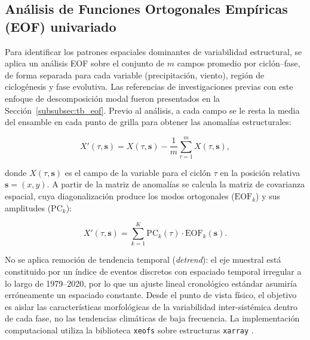 

\subsection{Análisis de Funciones Ortogonales Empíricas (EOF) univariado}\label{subsec:eof_univariado}

Para identificar los patrones espaciales dominantes de variabilidad estructural, se aplica un análisis EOF sobre el conjunto de $m$ campos promedio por ciclón--fase, de forma separada para cada variable (precipitación, viento), región de ciclogénesis y fase evolutiva. Las referencias de investigaciones previas con este enfoque de descomposición modal fueron presentados en la Sección~\ref{subsubsec:tb_eof}. Previo al análisis, a cada campo se le resta la media del ensamble en cada punto de grilla para obtener las anomalías estructurales:

\begin{equation}
    X'(\tau, \mathbf{s}) = X(\tau, \mathbf{s}) - \frac{1}{m}\sum_{\tau=1}^{m}X(\tau, \mathbf{s}),
\end{equation}

donde $X(\tau, \mathbf{s})$ es el campo de la variable para el ciclón $\tau$ en la posición relativa $\mathbf{s} = (x,y)$. A partir de la matriz de anomalías se calcula la matriz de covarianza espacial, cuya diagonalización produce los modos ortogonales ($\text{EOF}_k$) y sus amplitudes ($\text{PC}_k$):

\begin{equation}
    X'(\tau, \mathbf{s}) = \sum_{k=1}^{K} \text{PC}_k(\tau) \cdot \text{EOF}_k(\mathbf{s}).
\end{equation}

No se aplica remoción de tendencia temporal (\textit{detrend}): el eje muestral está constituido por un índice de eventos discretos con espaciado temporal irregular a lo largo de 1979--2020, por lo que un ajuste lineal cronológico estándar asumiría erróneamente un espaciado constante. Desde el punto de vista físico, el objetivo es aislar las características morfológicas de la variabilidad inter-sistémica dentro de cada fase, no las tendencias climáticas de baja frecuencia. La implementación computacional utiliza la biblioteca \texttt{xeofs} \citep{rieger2024xeofs} sobre estructuras \texttt{xarray} \citep{hoyer2017xarray}.

